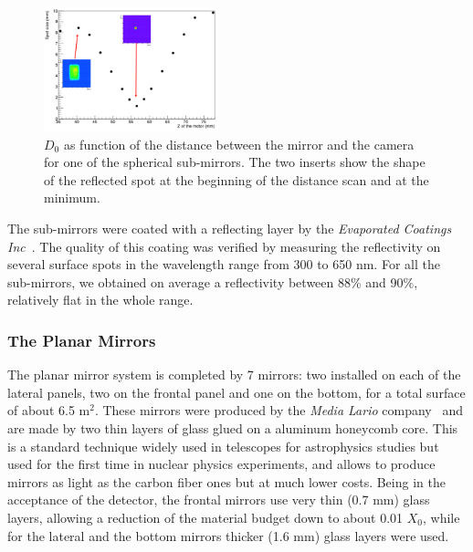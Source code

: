 \documentclass[5p,times,twocolumn]{elsarticle}
\begin{document}
\begin{figure}
\begin{center}
\includegraphics[width=0.45\textwidth]{SpotCMA.pdf}
\caption{$D_0$ as function of the distance between the mirror and the camera for one of the spherical sub-mirrors. The two inserts show the shape of the reflected spot at the beginning of the distance scan and at the minimum.}
\label{Fig:SpotCMA}
\end{center}
\end{figure}

The sub-mirrors were coated with a reflecting layer by the  {\it Evaporated Coatings Inc}~\cite{REF:ECI}.
The quality of this coating was verified by measuring the reflectivity on several surface spots in the wavelength range from 300 to 650 nm.
For all the sub-mirrors, we obtained on average a reflectivity between 88\% and 90\%, relatively flat in the whole range.

\subsubsection{The Planar Mirrors}

The planar mirror system is completed by 7 mirrors: two installed on each of the lateral panels, two on the frontal panel and one on the bottom, for a total surface of about 6.5 m$^2$.
These mirrors were produced by the {\it Media Lario} company~\cite{REF:MediaLario} and are made by two thin layers of glass glued on a aluminum honeycomb core.
This is a standard technique widely used in telescopes for astrophysics studies but used for the first time in nuclear physics experiments, and allows to produce mirrors as light as the carbon fiber ones but at much lower costs.
Being in the acceptance of the detector, the frontal mirrors use very thin (0.7 mm) glass layers, allowing a reduction of the material budget down to about 0.01 $X_0$, while for the lateral and the bottom mirrors thicker (1.6 mm) glass layers were used.
\end{document}
